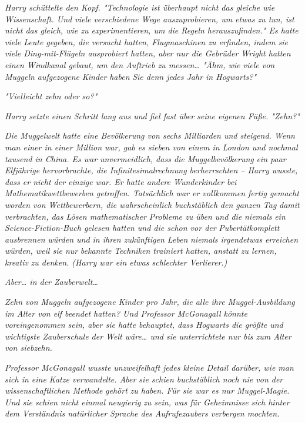 {\emph{Harry schüttelte den Kopf. "Technologie ist überhaupt nicht das gleiche wie Wissenschaft. Und viele verschiedene Wege auszuprobieren, um etwas zu tun, ist nicht das gleich, wie zu experimentieren, um die Regeln herauszufinden." Es hatte viele Leute gegeben, die versucht hatten, Flugmaschinen zu erfinden, indem sie viele Ding-mit-Flügeln ausprobiert hatten, aber nur die Gebrüder Wright hatten einen Windkanal gebaut, um den Auftrieb zu messen… "Ähm, wie viele von Muggeln aufgezogene} \emph{Kinder} \emph{\emph{haben}} \emph{Sie denn jedes Jahr in Hogwarts?"}

\emph{"Vielleicht zehn oder so?"}

\emph{Harry setzte einen Schritt lang aus und fiel fast über seine eigenen Füße. "\emph{Zehn?}"}

\emph{Die Muggelwelt hatte eine Bevölkerung von sechs Milliarden und steigend. Wenn man einer in einer Million war, gab es sieben von einem in London und nochmal tausend in China. Es war unvermeidlich, dass die Muggelbevölkerung} \emph{\emph{ein paar}} \emph{Elfjährige hervorbrachte, die Infinitesimalrechnung berherrschten -- Harry wusste, dass er nicht der einzige war. Er hatte andere Wunderkinder bei Mathematikwettbewerben getroffen. Tatsächlich war er vollkommen fertig gemacht worden von Wettbewerbern, die wahrscheinlich buchstäblich} \emph{\emph{den ganzen Tag}} \emph{damit verbrachten, das Lösen mathematischer Probleme zu üben und die} \emph{\emph{niemals}} \emph{ein Science-Fiction-Buch gelesen hatten und die schon vor der} \emph{\emph{Pubertät}\emph{komplett}} \emph{ausbrennen würden und in ihren zukünftigen Leben} \emph{\emph{niemals irgendetwas}} \emph{erreichen würden, weil sie nur} \emph{\emph{bekannte}} \emph{Techniken trainiert hatten, anstatt zu lernen,} \emph{\emph{kreativ}} \emph{zu denken. (Harry war ein etwas schlechter Verlierer.)}

\emph{Aber… in der Zauberwelt…}

\emph{Zehn von Muggeln aufgezogene Kinder pro Jahr, die alle ihre Muggel-Ausbildung im Alter von elf beendet hatten? Und Professor McGonagall könnte voreingenommen sein, aber sie hatte behauptet, dass Hogwarts die größte und wichtigste Zauberschule der Welt wäre… und sie unterrichtete nur bis zum Alter von siebzehn.}

\emph{Professor McGonagall wusste unzweifelhaft jedes kleine Detail darüber, wie man sich in eine Katze verwandelte. Aber sie schien buchstäblich noch nie von der wissenschaftlichen Methode} \emph{\emph{gehört}} \emph{zu haben. Für sie war es nur Muggel-Magie. Und sie schien nicht einmal} \emph{\emph{neugierig}} \emph{zu sein, was für Geheimnisse sich hinter dem Verständnis natürlicher Sprache des Aufrufezaubers verbergen mochten.}

}
